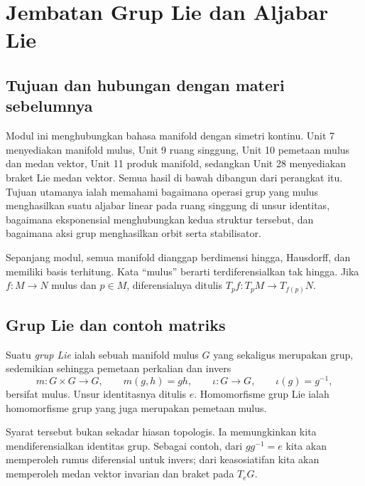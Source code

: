 
\setcounter{section}{30}
\section{Jembatan Grup Lie dan Aljabar Lie}
\label{o011-bridge-lie}

\subsection{Tujuan dan hubungan dengan materi sebelumnya}

Modul ini menghubungkan bahasa manifold dengan simetri kontinu. Unit 7
menyediakan manifold mulus, Unit 9 ruang singgung, Unit 10 pemetaan mulus dan
medan vektor, Unit 11 produk manifold, sedangkan Unit 28 menyediakan braket
Lie medan vektor. Semua hasil di bawah dibangun dari perangkat itu. Tujuan
utamanya ialah memahami bagaimana operasi grup yang mulus menghasilkan suatu
aljabar linear pada ruang singgung di unsur identitas, bagaimana eksponensial
menghubungkan kedua struktur tersebut, dan bagaimana aksi grup menghasilkan
orbit serta stabilisator.

Sepanjang modul, semua manifold dianggap berdimensi hingga, Hausdorff, dan
memiliki basis terhitung. Kata ``mulus'' berarti terdiferensialkan tak hingga.
Jika $f\colon M\to N$ mulus dan $p\in M$, diferensialnya ditulis
$T_pf\colon T_pM\to T_{f(p)}N$.

\subsection{Grup Lie dan contoh matriks}

\begin{definition}\label{o011-bl-def-lie-group}
Suatu \emph{grup Lie} ialah sebuah manifold mulus $G$ yang sekaligus merupakan
grup, sedemikian sehingga pemetaan perkalian dan invers
\[
  m\colon G\times G\longrightarrow G,\qquad m(g,h)=gh,
  \qquad
  \iota\colon G\longrightarrow G,\qquad \iota(g)=g^{-1},
\]
bersifat mulus. Unsur identitasnya ditulis $e$. Homomorfisme grup Lie ialah
homomorfisme grup yang juga merupakan pemetaan mulus.
\end{definition}

Syarat tersebut bukan sekadar hiasan topologis. Ia memungkinkan kita
mendiferensialkan identitas grup. Sebagai contoh, dari $gg^{-1}=e$ kita akan
memperoleh rumus diferensial untuk invers; dari keasosiatifan kita akan
memperoleh medan vektor invarian dan braket pada $T_eG$.

